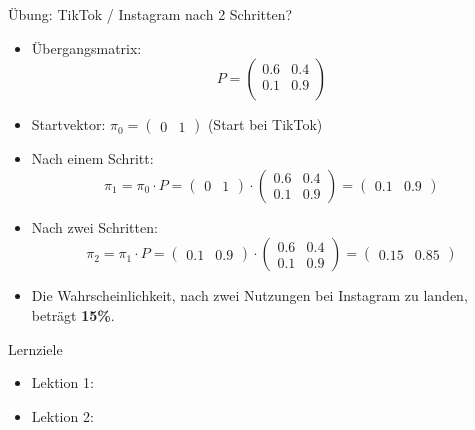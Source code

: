\begin{frame}{Übung: TikTok / Instagram nach 2 Schritten?}
    \begin{itemize}
        \item Übergangsmatrix:
              \[
                  P = \begin{pmatrix}
                      0.6 & 0.4 \\
                      0.1 & 0.9 \\
                  \end{pmatrix}
              \]
        \item Startvektor: $\pi_0 = \begin{pmatrix}0 & 1\end{pmatrix}$ (Start bei TikTok)
        \item Nach einem Schritt:
              \[
                  \pi_1 = \pi_0 \cdot P = \begin{pmatrix} 0 & 1 \end{pmatrix} \cdot \begin{pmatrix} 0.6 & 0.4 \\ 0.1 & 0.9 \end{pmatrix} = \begin{pmatrix} 0.1 & 0.9 \end{pmatrix}
              \]
        \item Nach zwei Schritten:
              \[
                  \pi_2 = \pi_1 \cdot P = \begin{pmatrix} 0.1 & 0.9 \end{pmatrix} \cdot \begin{pmatrix} 0.6 & 0.4 \\ 0.1 & 0.9 \end{pmatrix} = \begin{pmatrix} 0.15 & 0.85 \end{pmatrix}
              \]
        \item Die Wahrscheinlichkeit, nach zwei Nutzungen bei Instagram zu landen, beträgt \textbf{15\%}.
    \end{itemize}
\end{frame}

\begin{frame}[fragile]{Lernziele}
    \begin{itemize}[<+->]
        \item Lektion 1:
              \lernzielePtOne{\faCheckSquare}
        \item Lektion 2:
              \lernzielePtTwo{\faSquare}
    \end{itemize}
\end{frame}

